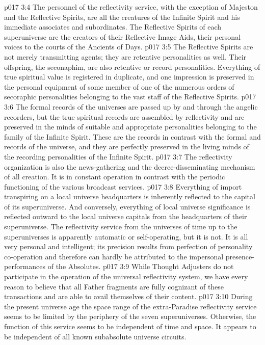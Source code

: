 \vs p017 3:4 The personnel of the reflectivity service, with the exception of Majeston and the Reflective Spirits, are all the creatures of the Infinite Spirit and his immediate associates and subordinates. The Reflective Spirits of each superuniverse are the creators of their Reflective Image Aids, their personal voices to the courts of the Ancients of Days.
\vs p017 3:5 \pc The Reflective Spirits are not merely transmitting agents; they are retentive personalities as well. Their offspring, the seconaphim, are also retentive or record personalities. Everything of true spiritual value is registered in duplicate, and one impression is preserved in the personal equipment of some member of one of the numerous orders of secoraphic personalities belonging to the vast staff of the Reflective Spirits.
\vs p017 3:6 The formal records of the universes are passed up by and through the angelic recorders, but the true spiritual records are assembled by reflectivity and are preserved in the minds of suitable and appropriate personalities belonging to the family of the Infinite Spirit. These are the  records in contrast with the formal and  records of the universe, and they are perfectly preserved in the living minds of the recording personalities of the Infinite Spirit.
\vs p017 3:7 The reflectivity organization is also the news\hyp{}gathering and the decree\hyp{}disseminating mechanism of all creation. It is in constant operation in contrast with the periodic functioning of the various broadcast services.
\vs p017 3:8 Everything of import transpiring on a local universe headquarters is inherently reflected to the capital of its superuniverse. And conversely, everything of local universe significance is reflected outward to the local universe capitals from the headquarters of their superuniverse. The reflectivity service from the universes of time up to the superuniverses is apparently automatic or self\hyp{}operating, but it is not. It is all very personal and intelligent; its precision results from perfection of personality co\hyp{}operation and therefore can hardly be attributed to the impersonal presence\hyp{}performances of the Absolutes.
\vs p017 3:9 While Thought Adjusters do not participate in the operation of the universal reflectivity system, we have every reason to believe that all Father fragments are fully cognizant of these transactions and are able to avail themselves of their content.
\vs p017 3:10 \pc During the present universe age the space range of the extra\hyp{}Paradise reflectivity service seems to be limited by the periphery of the seven superuniverses. Otherwise, the function of this service seems to be independent of time and space. It appears to be independent of all known subabsolute universe circuits.
